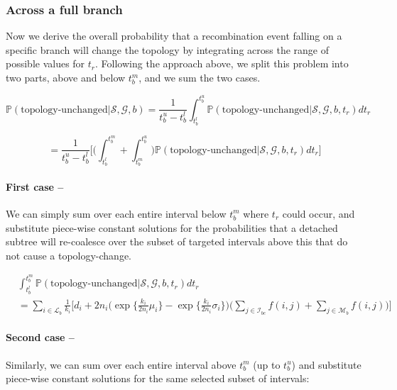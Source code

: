 \documentclass[11pt]{article}
\begin{document}
\subsubsection{Across a full branch}

Now we derive the overall probability that a recombination event falling on a specific branch will 
change the topology by integrating across the range of possible values for $t_r$.
Following the approach above, we split this problem into two parts, above and below
$t_b^m$, and we sum the two cases.

\begin{equation}
	\mathbb{P}(\text{topology-unchanged} | \mathcal{S}, \mathcal{G}, b) = 
	\frac{1}{t_b^u - t_b^l} \int_{t_b^l}^{t_b^u}
	\mathbb{P}(\text{topology-unchanged} | \mathcal{S}, \mathcal{G},b, t_r) dt_r
\end{equation}

\begin{equation}
	= \frac{1}{t_b^u - t_b^l}
	\bigg[
		\bigg(
			\int_{t_b^l}^{t_b^m} + 
			\int_{t_b^m}^{t_b^u}
		\bigg)
		\mathbb{P}(\text{topology-unchanged} | \mathcal{S}, \mathcal{G},b, t_r) dt_r
	\bigg]
\end{equation}


\paragraph{First case --}
We can simply sum over each entire interval below $t_b^m$ where $t_r$ could occur, and 
substitute piece-wise constant solutions for the probabilities that a detached
subtree will re-coalesce over the subset of targeted intervals above this that
do not cause a topology-change.

\begin{equation}
\begin{aligned}
	&\int_{t_b^l}^{t_b^m} {\mathbb{P}(\text{topology-unchanged} | \mathcal{S}, \mathcal{G}, b, t_r)} dt_r \\
	&= \sum_{i \in \mathcal{L}_b} \frac{1}{k_i} \Bigg[ 
		d_i + 2n_i \bigg( 
			\exp \bigg\{\frac{k_i}{2n_i} \mu_i \bigg\} - 
			\exp \bigg\{\frac{k_i}{2n_i} \sigma_i\bigg\} 
		\bigg)
		\bigg(
			\sum_{j \in \mathcal{I}_{bc}} f(i,j) + \sum_{j \in \mathcal{M}_b} f(i,j) 
		\bigg) 
	\Bigg]
\end{aligned}
\end{equation}

\paragraph{Second case --}
Similarly, we can sum over each entire interval above $t_b^m$ (up to $t_b^u$) and substitute piece-wise
constant solutions for the same selected subset of intervals:
\end{document}
